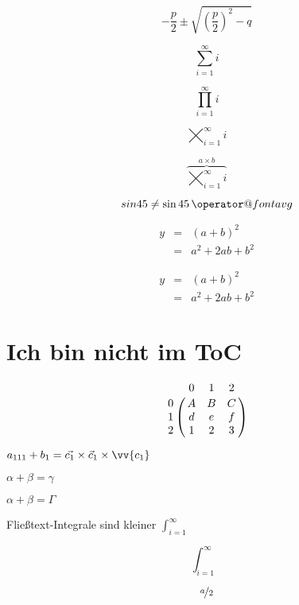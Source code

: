 \documentclass[15pt,ngerman]{scrreprt}
\makeatletter
\newcommand*\avg{%
\mathop{\operator@font
avg}}
\makeatother
\begin{document}
\begin{equation}
-\frac{p}{2} \pm \sqrt{ \left(\frac{p}{2}\right)^2 - q  }
\end{equation}


\begin{equation}
\sum_{i=1}^{\infty} i
\end{equation}

\begin{equation}
\prod_{i=1}^{\infty} i
\end{equation}

\begin{equation}
\bigtimes_{i=1}^{\infty} i
\end{equation}


\begin{equation}
\overbrace{\bigtimes_{i=1}^{\infty} i}^{a\times b}
\end{equation}

\begin{equation}
sin 45 \not= \sin 45 \avg
\end{equation}

\begin{eqnarray}
y &=& (a+ b)^2 \\
  &=& a^2 + 2ab + b^2
\end{eqnarray}

\begin{eqnarray*}
y &=& (a+ b)^2 \\
  &=& a^2 + 2ab + b^2
\end{eqnarray*}

\section*{Ich bin nicht im ToC}

\[
\bordermatrix{%
 & 0 & 1 & 2 \cr
0 & A & B & C \cr
1 & d & e & f \cr
2 & 1 & 2 & 3 \cr
}
\]

\( a_{111}+ b_1 =  \vec{c_1} \times \vec{c}_1  \times \vv{c_1}   \)

\( \alpha + \beta = \gamma\)

\( \alpha + \beta = \Gamma\)


Fließtext-Integrale sind kleiner \( \int_{i=1}^{\infty} \)

\[ \int_{i=1}^{\infty} \]

\[ \nicefrac{a}{2}\]
\end{document}
